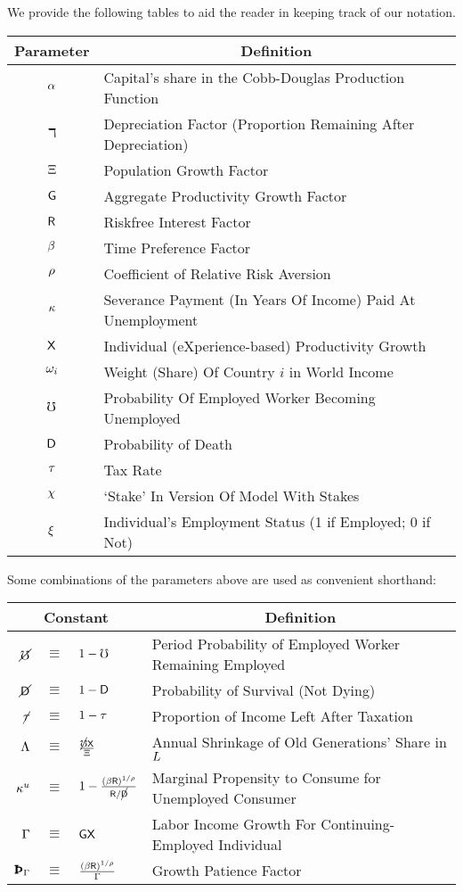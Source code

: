 \documentclass[titlepage,abstract,letterpaper]{econtex}
\begin{document}
We provide the following tables to aid the reader in keeping track of our notation.
\begin{center}
\begin{tabular}{|c|l|} \hline
 Parameter & \multicolumn{1}{|c|}{Definition}  \\ \hline
 $\alpha$ & Capital's share in the Cobb-Douglas Production Function\\
 $\daleth$ & Depreciation Factor (Proportion Remaining After Depreciation)\\
 $\Xi$ & Population Growth Factor \\
 $\mathsf{G}$ & Aggregate Productivity Growth Factor\\
 $\mathsf{R}$ & Riskfree Interest Factor \\
 $\beta$ & Time Preference Factor \\
 $\rho$ & Coefficient of Relative Risk Aversion \\
 $\kappa$ & Severance Payment (In Years Of Income) Paid At Unemployment \\
 $\mathsf{X}$ & Individual (eXperience-based) Productivity Growth \\
 $\omega_{i}$ & Weight (Share) Of Country $i$ in World Income \\
 $\mho$ & Probability Of Employed Worker Becoming Unemployed \\
 $\mathsf{D} $ & Probability of Death   \\
 $\tau$ & Tax Rate \\
 $\chi$ & `Stake' In Version Of Model With Stakes \\
 $\xi$ & Individual's Employment Status (1 if Employed; 0 if Not) \\
\hline
\end{tabular}
\end{center}

Some combinations of the parameters above are used as convenient shorthand:
\begin{center}
\begin{tabular}{|rcl|l|} \hline
 \multicolumn{3}{|c|}{Constant} & \multicolumn{1}{c|}{Definition}  \\ \hline
 $\cancel{\mho}$ & $\equiv$ & $1-\mho$ & Period Probability of Employed Worker Remaining Employed \\
 $\cancel{\mathsf{D}}$ & $\equiv$ & $1-\mathsf{D}$ & Probability of Survival (Not Dying) \\
 $\cancel{\tau}$ & $\equiv$ & $1-\tau$ & Proportion of Income Left After Taxation \\
 $\Lambda$ & $\equiv$ & $\frac{\cancel{\mho}\mathsf{X}}{\Xi}$ & Annual Shrinkage of Old Generations' Share in $L$ \\
 $\kappa^{u}$ & $\equiv$ & $1- \frac{(\beta \mathsf{R})^{1/\rho}}{\mathsf{R}/\cancel{\mathsf{D}}}$ & Marginal Propensity to Consume for Unemployed Consumer \\
 $\Gamma$ & $\equiv$ & $\mathsf{G} \mathsf{X}$ & Labor Income Growth For Continuing-Employed Individual \\
 $\PatPGro$ & $\equiv$ & $\frac{(\beta \mathsf{R})^{1/\rho}}{\Gamma}$ & Growth Patience Factor \\
\hline
\end{tabular}
\end{center}
\end{document}
